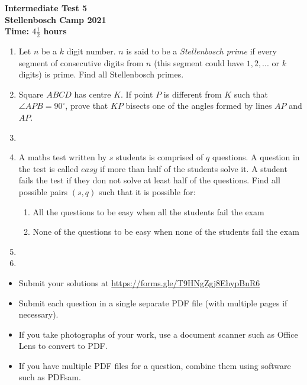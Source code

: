 \documentclass{article}
\begin{document}
\thispagestyle{empty}

\begin{center}
  \textbf{\Large Intermediate Test 5}
  \\ \vspace{1em}
  \textbf{\large Stellenbosch Camp 2021}
  \\ \vspace{1em}
  \textbf{\large Time: $4\frac{1}{2}$ hours}
\end{center}

\bigskip

\begin{enumerate}[itemsep=\fill]

\item %
Let $n$ be a $k$ digit number. $n$ is said to be a \textit{Stellenbosch prime} if every segment of consecutive digits from $n$ (this segment could have $1,2,...$ or $k$ digits) is prime. Find all Stellenbosch primes.


\item %
Square $ABCD$ has centre $K$. If point $P$ is different from $K$ such that $\angle APB = 90^{\circ}$, prove that $KP$ bisects one of the angles formed by lines $AP$ and $AP$.

\item %


\item %
A maths test written by $s$ students is comprised of $q$ questions. A question in the test is called $easy$ if more than half of the students solve it. A student fails the test if they don not solve at least half of the questions. Find all possible pairs $(s, q)$ such that it is possible for:
\begin{enumerate}
\item All the questions to be easy when all the students fail the exam
\item None of the questions to be easy when none of the students fail the exam 
\end{enumerate}

\item %


\item %

\end{enumerate}


\vfill
\begin{itemize}
	\item Submit your solutions at \href{https://forms.gle/T9HNgZgj8EhypBnR6}{https://forms.gle/T9HNgZgj8EhypBnR6}
	\item Submit each question in a single separate PDF file (with multiple pages if necessary).
	\item If you take photographs of your work, use a document scanner such as Office Lens to convert to PDF.
	\item If you have multiple PDF files for a question, combine them using software such as PDFsam.
\end{itemize}
\end{document}
